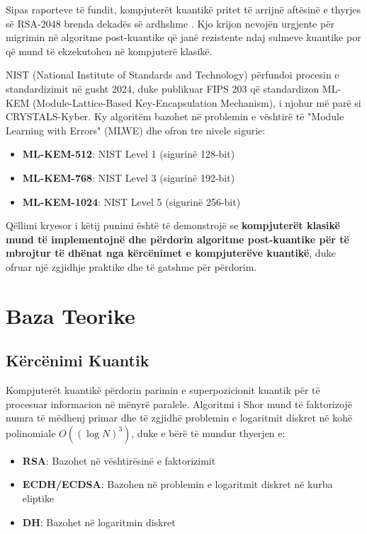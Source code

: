 \documentclass[conference]{IEEEtran}
\begin{document}
Sipas raporteve të fundit, kompjuterët kuantikë pritet të arrijnë aftësinë e thyrjes së RSA-2048 brenda dekadës së ardhshme \cite{nas2019}. Kjo krijon nevojën urgjente për migrimin në algoritme post-kuantike që janë rezistente ndaj sulmeve kuantike por që mund të ekzekutohen në kompjuterë klasikë.

NIST (National Institute of Standards and Technology) përfundoi procesin e standardizimit në gusht 2024, duke publikuar FIPS 203 \cite{nist2024} që standardizon ML-KEM (Module-Lattice-Based Key-Encapsulation Mechanism), i njohur më parë si CRYSTALS-Kyber. Ky algoritëm bazohet në problemin e vështirë të "Module Learning with Errors" (MLWE) dhe ofron tre nivele sigurie:

\begin{itemize}
\item \textbf{ML-KEM-512}: NIST Level 1 (sigurinë 128-bit)
\item \textbf{ML-KEM-768}: NIST Level 3 (sigurinë 192-bit)
\item \textbf{ML-KEM-1024}: NIST Level 5 (sigurinë 256-bit)
\end{itemize}

Qëllimi kryesor i këtij punimi është të demonstrojë se \textbf{kompjuterët klasikë mund të implementojnë dhe përdorin algoritme post-kuantike për të mbrojtur të dhënat nga kërcënimet e kompjuterëve kuantikë}, duke ofruar një zgjidhje praktike dhe të gatshme për përdorim.

\section{Baza Teorike}

\subsection{Kërcënimi Kuantik}

Kompjuterët kuantikë përdorin parimin e superpozicionit kuantik për të procesuar informacion në mënyrë paralele. Algoritmi i Shor mund të faktorizojë numra të mëdhenj primar dhe të zgjidhë problemin e logaritmit diskret në kohë polinomiale $O((\log N)^3)$, duke e bërë të mundur thyerjen e:

\begin{itemize}
\item \textbf{RSA}: Bazohet në vështirësinë e faktorizimit
\item \textbf{ECDH/ECDSA}: Bazohen në problemin e logaritmit diskret në kurba eliptike
\item \textbf{DH}: Bazohet në logaritmin diskret
\end{itemize}
\end{document}
